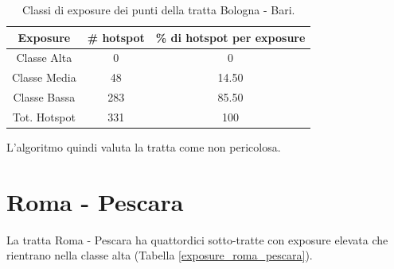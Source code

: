 \begin{table}[H]
	\centering
	\begin{tabular}{|c|c|c|}
		\hline
		\rowcolor[HTML]{C0C0C0} 
		\textbf{Exposure} & \textbf{\# hotspot} & \textbf{\% di hotspot per exposure} \\ \hline
		Classe Alta       & 0                   & 0                                   \\ \hline
		Classe Media      & 48                 & 14.50                               \\ \hline
		Classe Bassa      & 283                 & 85.50                              \\ \hline
		Tot. Hotspot      & 331                 & 100                                 \\ \hline
	\end{tabular}
\caption{Classi di exposure dei punti della tratta Bologna - Bari.}
\label{risultati_sotto_tratte_bologna_bari}

\end{table}




L'algoritmo quindi valuta la tratta come non pericolosa.

\section{Roma - Pescara}
La tratta Roma - Pescara ha quattordici sotto-tratte con exposure elevata che rientrano nella classe alta (Tabella \ref{exposure_roma_pescara}).

